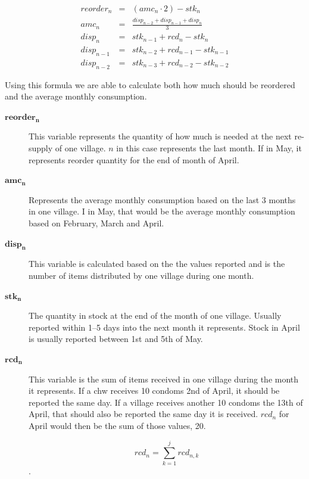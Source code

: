 \begin{eqnarray}
reorder_{n} & = & (amc_{n} \cdot 2) - stk_{n} \\
amc_{n} & = & \frac{disp_{n-2} + disp_{n-1} + disp_{n}}{3} \\
disp_{n} & = & stk_{n-1} + rcd_{n} - stk_{n} \\
disp_{n-1} & = & stk_{n-2} + rcd_{n-1} - stk_{n-1} \\
disp_{n-2} & = & stk_{n-3} + rcd_{n-2} - stk_{n-2}
\label{eq:reorder}
\end{eqnarray}

Using this formula we are able to calculate both how much should be reordered and the average monthly consumption.


\begin{description}
\item[$\mathbf{reorder_{n}}$]
This variable represents the quantity of how much is needed at the next re-supply of one village. $n$ in this case represents the last month. If in May, it represents reorder quantity for the end of month of April.
\item[$\mathbf{amc_{n}}$]
Represents the average monthly consumption based on the last 3 months in one village. I in May, that would be the average monthly consumption based on February, March and April.
\item[$\mathbf{disp_{n}}$]
This variable is calculated based on the the values reported and is the number of items distributed by one village during one month.
\item[$\mathbf{stk_{n}}$]
The quantity in stock at the end of the month of one village. Usually reported within 1--5 days into the next month it represents. Stock in April is usually reported between 1st and 5th of May.
\item[$\mathbf{rcd_{n}}$]
This variable is the sum of items received in one village during the month it represents. If a \gls{chw} receives 10 condoms 2nd of April, it should be reported the same day. If a village receives another 10 condoms the 13th of April, that should also be reported the same day it is received. $rcd_{n}$ for April would then be the sum of those values, 20.

\begin{equation}
rcd_{n} = \sum_{k = 1}^{j} rcd_{n,k}
\label{eq:received}
\end{equation}.

\end{description}



